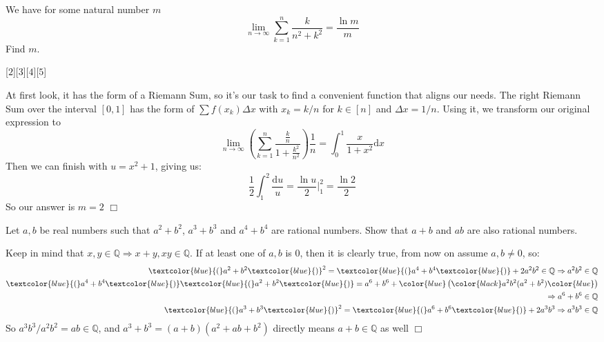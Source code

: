 \begin{problem}
    We have for some natural number \( m \)
    \[
    \lim_{n \to \infty} \sum_{k=1}^{n} \frac{k}{n^2 + k^2} = \frac{\ln m}{m}
    \]
    Find \( m \).
\end{problem}
[$2$][$3$][$4$][$5$]

\begin{solution}[B]
    At first look, it has the form of a Riemann Sum, so it's our task to find a convenient function that aligns our needs. The right Riemann Sum over the interval $[0,1]$ has the form of $\sum f(x_k) \Delta x$ with $x_k = k/n$ for $k \in [n]$ and $\Delta x = 1/n$. Using it, we transform our original expression to
    $$ \lim _{n \rightarrow \infty} \left(\sum_{k=1}^n \frac{\frac{k}{n}}{1 + \frac{k^2}{n^2}} \right) \frac{1}{n} = \int_0^1 \frac{x}{1 + x^2} \mathrm{d}x$$
    Then we can finish with $u = x^2+1$, giving us:
    $$ \frac{1}{2}\int_1^2 \frac{\mathrm{d}u}{u} = \frac{\ln u}{2} \bigg|_1^2 = \frac{\ln 2}{2}$$
    So our answer is $m=2$ $\Box$
\end{solution}

\begin{problem}[B][8]
    Let $a,b$ be real numbers such that  $a^2+b^2$, $a^3+b^3$ and $a^4+b^4$ are rational numbers. Show that $a+b$ and $ab$ are also rational numbers.
\end{problem}

\begin{solution}
    Keep in mind that $x, y \in \mathbb{Q} \Rightarrow x+y, xy \in \mathbb{Q}$. If at least one of $a,b$ is 0, then it is clearly true, from now on assume $a,b \neq 0$, so:
    \begin{align*}
        \textcolor{blue}{(}a^2+b^2\textcolor{blue}{)}^2 = \textcolor{blue}{(} a^4+b^4 \textcolor{blue}{)} + 2a^2b^2 \in \mathbb{Q} \Rightarrow a^2b^2 \in \mathbb{Q} \\
        \textcolor{blue}{(}a^4+b^4\textcolor{blue}{)} \textcolor{blue}{(} a^2+b^2 \textcolor{blue}{)} = a^6+b^6 +  \color{blue} \left ( \color{black} a^2b^2(a^2+b^2) \color{blue}\right ) \\
        \Rightarrow a^6+b^6 \in \mathbb{Q} \\
        \textcolor{blue}{(} a^3+b^3 \textcolor{blue}{)}^2 = \textcolor{blue}{(} a^6 + b^6 \textcolor{blue}{)} + 2a^3b^3 \Rightarrow a^3b^3 \in \mathbb{Q}
    \end{align*}
    So $a^3b^3 / a^2b^2 = ab \in \mathbb{Q}$, and $a^3+b^3 = (a+b)(a^2+ab+b^2)$ directly means $a+b \in \mathbb{Q}$ as well $\Box$
    
\end{solution}

